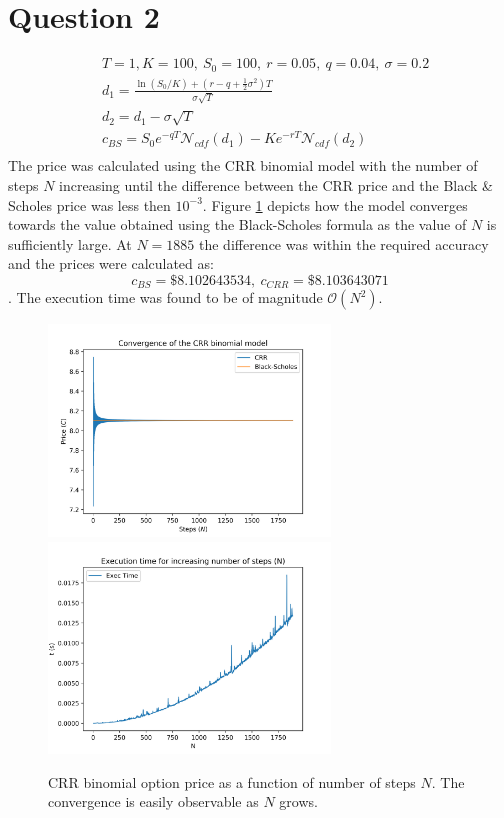 \documentclass{article}
\begin{document}
\section*{Question 2}
\begin{align*}
	&T=1, K=100, \ S_0 = 100, \ r=0.05, \ q=0.04, \ \sigma = 0.2 \\
	&d_1 = \frac{\ln (S_0 / K) + (r - q + \frac{1}{2}\sigma^2)T}{\sigma \sqrt{T}} \\
	&d_2 = d_1 - \sigma \sqrt{T} \\
	&c_{BS} = S_0e^{-qT}\mathcal{N}_{cdf}(d_1) - Ke^{-rT}\mathcal{N}_{cdf}(d_2)\\
\end{align*}
The price was calculated using the CRR binomial model with the number of steps $N$ increasing until the difference between the CRR price and the Black \& Scholes price was less then $10^{-3}$. Figure \ref{convergence} depicts how the model converges towards the value obtained using the Black-Scholes formula as the value of $N$ is sufficiently large. At $N=1885$ the difference was within the required accuracy and the prices were calculated as:
$$c_{BS} = \$8.102643534, \ c_{CRR} = \$8.103643071$$. The execution time was found to be of magnitude $\mathcal{O}(N^2)$. 
\begin{figure}[H]
	\centering
	\includegraphics[width=75mm]{images/convergence.png}
	\includegraphics[width=75mm]{images/q2_time.png}
	\caption{CRR binomial option price as a function of number of steps $N$. The convergence is easily observable as $N$ grows.}
	\label{convergence}
\end{figure}
\end{document}
